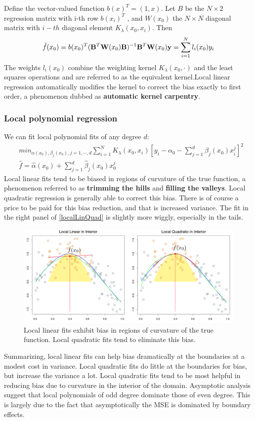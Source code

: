 Define the vector-valued function $b(x)^T = (1, x)$. Let $B$ be the $N \times 2$ regression matrix with i-th row $b(x_i)^T$ , and $W(x_0)$ the $N \times N$ diagonal matrix with $i-th$ diagonal element $K_\lambda(x_0,x_i)$. Then
\begin{equation}
\hat{f}(x_0)= b(x_0)^T(\mathbf{B}^T\mathbf{W}(x_0)\mathbf{B})^{-1} \mathbf{B}^T\mathbf{W}(x_0)\mathbf{y}= \sum_{i=1}^N l_i(x_0)y_i
\end{equation}
The weights $l_i(x_0)$ combine the weighting kernel $K_\lambda(x_0, \cdot)$ and the least squares operations and are referred to as the equivalent kernel.Local linear regression automatically modifies the kernel to correct the bias exactly to
first order, a phenomenon dubbed as \textbf{automatic kernel carpentry}.

\subsubsection{Local polynomial regression}
We can fit local polynomial fits of any degree $d$:
\begin{equation}
\begin{aligned}
&min_{\alpha(x_0),\beta_j(x_0),j=1,\cdots,d} \sum_{i=1}^N K_\lambda(x_0,x_i)\left[ y_i - \alpha_0 -\sum_{j=1}^d\beta_j(x_0)x_i^j\right]^2\\
&\hat{f} = \hat{\alpha}(x_0) + \sum_{j=1}^d \hat{\beta}_j(x_0)x_0^j
\end{aligned}
\end{equation}
Local linear fits tend to be biased in regions of curvature of the true function, a phenomenon referred to as \textbf{trimming the hills} and \textbf{filling the valleys}. Local quadratic regression is generally able to correct this bias. There is of course a price to be paid for this bias reduction, and that is increased variance. The fit in the right panel of \autoref{localLinQuad} is slightly more
wiggly, especially in the tails.
\begin{figure}
\centering
\includegraphics[scale=0.4]{img/localLinQuad}
\caption{Local linear fits exhibit bias in regions of curvature of the true function. Local quadratic fits tend to eliminate this bias.}
\label{localLinQuad}
\end{figure}
Summarizing, local linear fits can help bias dramatically at the boundaries at a modest cost in variance. Local quadratic fits do little at the boundaries for bias, but increase the variance a lot. Local quadratic fits tend to be most helpful in reducing bias due to curvature in the interior of the domain. Asymptotic analysis suggest that local polynomials of odd degree dominate those of even degree. This is largely due to the fact that asymptotically the MSE is dominated by boundary effects.
